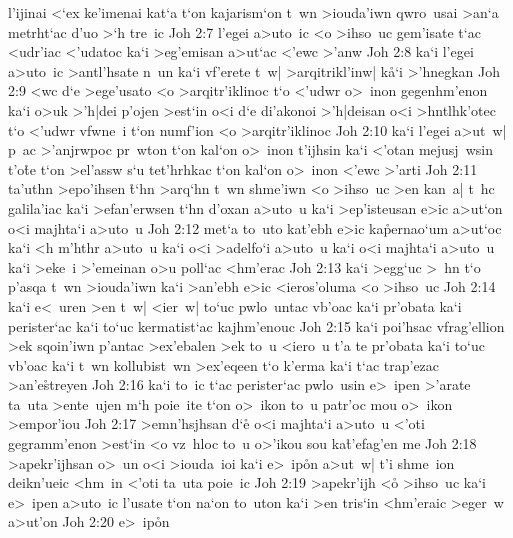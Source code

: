 l'ijinai
<`ex
ke'imenai
kat`a
t`on
kajarism`on
t~wn
>iouda'iwn
qwro~usai
>an`a
metrht`ac
d'uo
>`h
tre~ic\bibvsend
\vs Joh 2:7
l'egei
a>uto~ic
<o
>ihso~uc
gem'isate
t`ac
<udr'iac
<'udatoc
ka`i
>eg'emisan
a>ut`ac
<'ewc
>'anw\bibvsend
\vs Joh 2:8
ka`i
l'egei
a>uto~ic
>antl'hsate
n~un
ka`i
vf'erete
t~w|
>arqitrikl'inw|
k\r{a}`i
>'hnegkan\bibvsend
\vs Joh 2:9
<wc
d`e
>ege'usato
<o
>arqitr'iklinoc
t`o
<'udwr
o>~inon
gegenhm'enon
ka`i
o>uk
>'h|dei
p'ojen
>est`in
o<i
d`e
di'akonoi
>'h|deisan
o<i
>hntlhk'otec
t`o
<'udwr
vfwne~i
t`on
numf'ion
<o
>arqitr'iklinoc\bibvsend
\vs Joh 2:10
ka`i
l'egei
a>ut~w|
p~ac
>'anjrwpoc
pr~wton
t`on
kal`on
o>~inon
t'ijhsin
ka`i
<'otan
mejusj~wsin
t'o\r{t}e
t`on
>el'assw
s`u
tet'hrhkac
t`on
kal`on
o>~inon
<'ewc
>'arti\bibvsend
\vs Joh 2:11
ta'uthn
>epo'ihsen
\r{t}`hn
>arq`hn
t~wn
shme'iwn
<o
>ihso~uc
>en
kan~a|
t~hc
galila'iac
ka`i
>efan'erwsen
t`hn
d'oxan
a>uto~u
ka`i
>ep'isteusan
e>ic
a>ut`on
o<i
majhta`i
a>uto~u\bibvsend
\vs Joh 2:12
met`a
to~uto
kat'ebh
e>ic
ka\r{p}ernao`um
a>ut`oc
ka`i
<h
m'hthr
a>uto~u
ka`i
o<i
>adelfo`i
a>uto~u
ka`i
o<i
majhta`i
a>uto~u
ka`i
>eke~i
>'emeinan
o>u
poll`ac
<hm'erac\bibvsend
\vs Joh 2:13
ka`i
>egg`uc
>~hn
t`o
p'asqa
t~wn
>iouda'iwn
ka`i
>an'ebh
e>ic
<ieros'oluma
<o
>ihso~uc\bibvsend
\vs Joh 2:14
ka`i
e<~uren
>en
t~w|
<ier~w|
to`uc
pwlo~untac
vb'oac
ka`i
pr'obata
ka`i
perister`ac
ka`i
to`uc
kermatist`ac
kajhm'enouc\bibvsend
\vs Joh 2:15
ka`i
poi'hsac
vfrag'ellion
>ek
sqoin'iwn
p'antac
>ex'ebalen
>ek
to~u
<iero~u
t'a
te
pr'obata
ka`i
to`uc
vb'oac
ka`i
t~wn
kollubist~wn
>ex'eqeen
t`o
k'erma
ka`i
t`ac
trap'ezac
>an'e\r{s}treyen\bibvsend
{}
\vs Joh 2:16
ka`i
to~ic
t`ac
perister`ac
pwlo~usin
e>~ipen
>'arate
ta~uta
>ente~ujen
m`h
poie~ite
t`on
o>~ikon
to~u
patr'oc
mou
o>~ikon
>empor'iou\bibvsend
\vs Joh 2:17
>emn'hsjhsan
d`e\r{}
o<i
majhta`i
a>uto~u
<'oti
gegramm'enon
>est`in
<o
vz~hloc
to~u
o>'ikou
sou
ka\r{t}'efag'en
me\bibvsend
\vs Joh 2:18
>apekr'ijhsan
o>~un
o<i
>iouda~ioi
ka`i
e>~ip\r{o}n
a>ut~w|
t'i
shme~ion
deikn'ueic
<hm~in
<'oti
ta~uta
poie~ic\bibvsend
\vs Joh 2:19
>apekr'ijh
<o\r{}
>ihso~uc
ka`i
e>~ipen
a>uto~ic
l'usate
t`on
na`on
to~uton
ka`i
>en
tris`in
<hm'eraic
>eger~w
a>ut'on\bibvsend
\vs Joh 2:20
e>~ip\r{o}n
